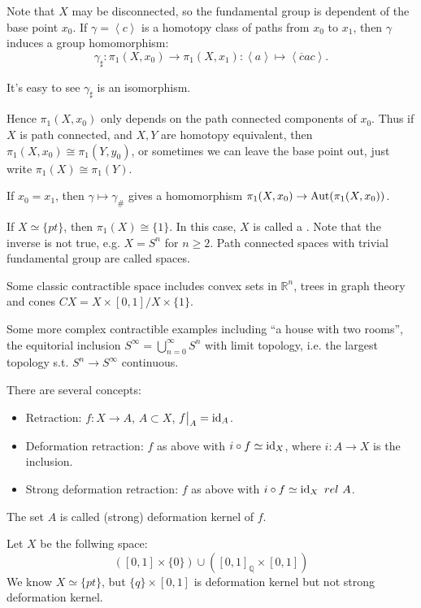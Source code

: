 Note that $X$ may be disconnected, so the fundamental group
is dependent of the base point $x_0$.
If $\gamma = \left<c \right>$ is a homotopy class of paths from $x_0$ to $x_1$,
then $\gamma$ induces a group homomorphism:
\[
\gamma_\sharp : \pi_1(X, x_0)\to \pi_1(X, x_1):
\left<a \right>\mapsto \left< \overline{c}ac \right>.
\]

It's easy to see $\gamma_\sharp$ is an isomorphism.

Hence $\pi_1(X, x_0)$ only depends on the path connected components of $x_0$.
Thus if $X$ is path connected, and $X, Y$ are homotopy equivalent,
then $\pi_1(X, x_0)\cong \pi_1(Y, y_0)$, or sometimes we can leave the base
point out, just write $\pi_1(X)\cong \pi_1(Y)$.
\begin{remark}
    If $x_0 = x_1$, then $\gamma\mapsto \gamma_\#$ gives a homomorphism
	$\pi_1(X, x_0)\to \operatorname{Aut}(\pi_1(X,x_0))$.
\end{remark}

\begin{example}
    If $X\simeq \{pt\}$, then $\pi_1(X) \cong \{1\}$.
	In this case, $X$ is called a .
	Note that the inverse is not true, e.g. $X = S^n$ for $n\ge 2$.
	Path connected spaces with trivial fundamental group
	are called  spaces.

	Some classic contractible space includes convex sets in $\mathbb{R}^n$,
	trees in graph theory and cones $CX = X\times [0, 1]/ X\times \{1\}$.
\end{example}

Some more complex contractible examples including ``a house with two rooms'',
the equitorial inclusion $S^\infty = \bigcup_{n=0}^\infty S^n$ with
limit topology, i.e. the largest topology s.t. $S^n\to S^\infty$ continuous.

There are several concepts:
\begin{itemize}
	\item Retraction: $f:X \to A$, $A \subset X$, $f\big|_{A} = \operatorname{id}_A$.
	\item Deformation retraction: $f$ as above with $i\circ f \simeq \operatorname{id}_X$,
		where  $i: A\to X$ is the inclusion.
	\item Strong deformation retraction: $f$ as above with
		$i\circ f \simeq \id_X \ rel\ A$.
\end{itemize}
The set $A$ is called (strong) deformation kernel of $f$.

\begin{example}
    Let $X$ be the follwing space:
	\[
		([0,1]\times \{0\}) \cup ([0, 1]_{\mathbb{Q}} \times [0, 1])
	\]
	We know $X\simeq \{pt\}$,
	but $\{q\}\times [0,1]$ is deformation kernel but not strong deformation kernel.
\end{example}


